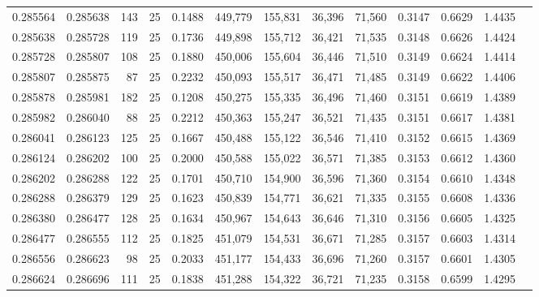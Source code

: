 \begin{tabular}{rrrrrrrrrrrrr}
0.285564 & 0.285638 &   143 &  25 &                                     0.1488 & 449,779 & 155,831 &  36,396 &  71,560 & 0.3147 & 0.6629 & 1.4435 \\
0.285638 & 0.285728 &   119 &  25 &                                     0.1736 & 449,898 & 155,712 &  36,421 &  71,535 & 0.3148 & 0.6626 & 1.4424 \\
0.285728 & 0.285807 &   108 &  25 &                                     0.1880 & 450,006 & 155,604 &  36,446 &  71,510 & 0.3149 & 0.6624 & 1.4414 \\
0.285807 & 0.285875 &    87 &  25 &                                     0.2232 & 450,093 & 155,517 &  36,471 &  71,485 & 0.3149 & 0.6622 & 1.4406 \\
0.285878 & 0.285981 &   182 &  25 &                                     0.1208 & 450,275 & 155,335 &  36,496 &  71,460 & 0.3151 & 0.6619 & 1.4389 \\
0.285982 & 0.286040 &    88 &  25 &                                     0.2212 & 450,363 & 155,247 &  36,521 &  71,435 & 0.3151 & 0.6617 & 1.4381 \\
0.286041 & 0.286123 &   125 &  25 &                                     0.1667 & 450,488 & 155,122 &  36,546 &  71,410 & 0.3152 & 0.6615 & 1.4369 \\
0.286124 & 0.286202 &   100 &  25 &                                     0.2000 & 450,588 & 155,022 &  36,571 &  71,385 & 0.3153 & 0.6612 & 1.4360 \\
0.286202 & 0.286288 &   122 &  25 &                                     0.1701 & 450,710 & 154,900 &  36,596 &  71,360 & 0.3154 & 0.6610 & 1.4348 \\
0.286288 & 0.286379 &   129 &  25 &                                     0.1623 & 450,839 & 154,771 &  36,621 &  71,335 & 0.3155 & 0.6608 & 1.4336 \\
0.286380 & 0.286477 &   128 &  25 &                                     0.1634 & 450,967 & 154,643 &  36,646 &  71,310 & 0.3156 & 0.6605 & 1.4325 \\
0.286477 & 0.286555 &   112 &  25 &                                     0.1825 & 451,079 & 154,531 &  36,671 &  71,285 & 0.3157 & 0.6603 & 1.4314 \\
0.286556 & 0.286623 &    98 &  25 &                                     0.2033 & 451,177 & 154,433 &  36,696 &  71,260 & 0.3157 & 0.6601 & 1.4305 \\
0.286624 & 0.286696 &   111 &  25 &                                     0.1838 & 451,288 & 154,322 &  36,721 &  71,235 & 0.3158 & 0.6599 & 1.4295 \\

\end{tabular}
